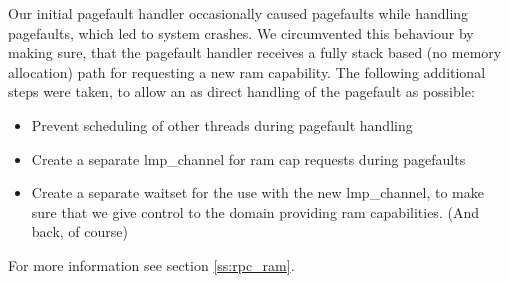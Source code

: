 Our initial pagefault handler occasionally caused pagefaults while handling 
pagefaults, which led to system crashes. We circumvented this behaviour by 
making sure, that the pagefault handler receives a fully stack based (no 
memory allocation) path for requesting a new ram capability. The following 
additional steps were taken, to allow an as direct handling of the pagefault 
as possible:
\begin{itemize}
	\item Prevent scheduling of other threads during pagefault handling

	\item Create a separate lmp\_channel for ram cap requests during pagefaults

	\item Create a separate waitset for the use with the new lmp\_channel, 
    to make sure that we give control to the domain providing ram 
    capabilities. (And back, of course)
\end{itemize}
For more information see section \ref{ss:rpc_ram}.
